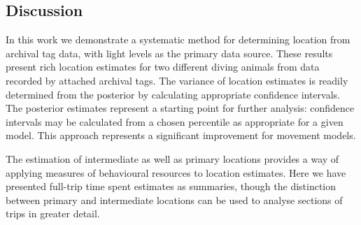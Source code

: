 \documentclass[10pt]{article}
\begin{document}







  
  
  


\subsection*{Discussion}

In this work we demonstrate a systematic method for determining
location from archival tag data, with light levels as the primary data
source.  These results present rich location estimates for two
different diving animals from data recorded by attached archival
tags. The variance of location estimates is readily determined from
the posterior by calculating appropriate confidence intervals.  The
posterior estimates represent a starting point for further analysis:
confidence intervals may be calculated from a chosen percentile as
appropriate for a given model. This approach represents a significant
improvement for movement models.

The estimation of intermediate as well as primary locations provides a
way of applying measures of behavioural resources to location
estimates. Here we have presented full-trip time spent estimates as
summaries, though the distinction between primary and intermediate
locations can be used to analyse sections of trips in greater detail.
\end{document}
